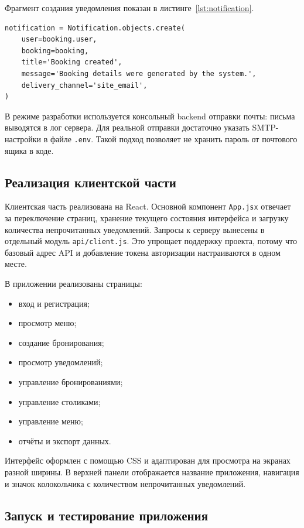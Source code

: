 Фрагмент создания уведомления показан в листинге~\ref{lst:notification}.

\begin{lstlisting}[caption={Создание уведомления о бронировании}, label={lst:notification}]
notification = Notification.objects.create(
    user=booking.user,
    booking=booking,
    title='Booking created',
    message='Booking details were generated by the system.',
    delivery_channel='site_email',
)
\end{lstlisting}

В режиме разработки используется консольный backend отправки почты: письма выводятся
в лог сервера. Для реальной отправки достаточно указать SMTP-настройки в файле
\texttt{.env}. Такой подход позволяет не хранить пароль от почтового ящика в коде.

\subsection{Реализация клиентской части}

Клиентская часть реализована на React. Основной компонент \texttt{App.jsx} отвечает
за переключение страниц, хранение текущего состояния интерфейса и загрузку количества
непрочитанных уведомлений. Запросы к серверу вынесены в отдельный модуль
\texttt{api/client.js}. Это упрощает поддержку проекта, потому что базовый адрес API
и добавление токена авторизации настраиваются в одном месте.

В приложении реализованы страницы:

\begin{itemize}
  \item вход и регистрация;
  \item просмотр меню;
  \item создание бронирования;
  \item просмотр уведомлений;
  \item управление бронированиями;
  \item управление столиками;
  \item управление меню;
  \item отчёты и экспорт данных.
\end{itemize}

Интерфейс оформлен с помощью CSS и адаптирован для просмотра на экранах разной
ширины. В верхней панели отображается название приложения, навигация и значок
колокольчика с количеством непрочитанных уведомлений.

\subsection{Запуск и тестирование приложения}

